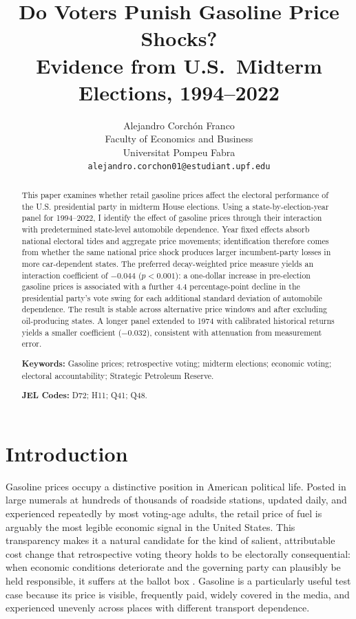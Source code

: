 \documentclass[12pt]{article}
\title{\textbf{Do Voters Punish Gasoline Price Shocks?\\
Evidence from U.S.\ Midterm Elections, 1994--2022}}
\author{Alejandro Corch\'on Franco\\[4pt]
\small Faculty of Economics and Business\\
\small Universitat Pompeu Fabra\\[2pt]
\small \texttt{alejandro.corchon01@estudiant.upf.edu}}
\date{}
\begin{document}
\maketitle
\thispagestyle{empty}


\begin{abstract}
\noindent
This paper examines whether retail gasoline prices affect the electoral performance of the U.S. presidential party in midterm House elections. Using a state-by-election-year panel for 1994--2022, I identify the effect of gasoline prices through their interaction with predetermined state-level automobile dependence. Year fixed effects absorb national electoral tides and aggregate price movements; identification therefore comes from whether the same national price shock produces larger incumbent-party losses in more car-dependent states. The preferred decay-weighted price measure yields an interaction coefficient of $-0.044$ ($p<0.001$): a one-dollar increase in pre-election gasoline prices is associated with a further 4.4 percentage-point decline in the presidential party's vote swing for each additional standard deviation of automobile dependence. The result is stable across alternative price windows and after excluding oil-producing states. A longer panel extended to 1974 with calibrated historical returns yields a smaller coefficient ($-0.032$), consistent with attenuation from measurement error.

\noindent\textbf{Keywords:} Gasoline prices; retrospective voting; midterm elections; economic voting; electoral accountability; Strategic Petroleum Reserve.

\noindent\textbf{JEL Codes:} D72; H11; Q41; Q48.

\end{abstract}

\newpage
\setcounter{page}{1}

\section{Introduction}
\label{sec:intro}

Gasoline prices occupy a distinctive position in American political life. Posted in large numerals at hundreds of thousands of roadside stations, updated daily, and experienced repeatedly by most voting-age adults, the retail price of fuel is arguably the most legible economic signal in the United States. This transparency makes it a natural candidate for the kind of salient, attributable cost change that retrospective voting theory holds to be electorally consequential: when economic conditions deteriorate and the governing party can plausibly be held responsible, it suffers at the ballot box \citep{Fiorina1981, Lewis-Beck1988}. Gasoline is a particularly useful test case because its price is visible, frequently paid, widely covered in the media, and experienced unevenly across places with different transport dependence.
\end{document}
